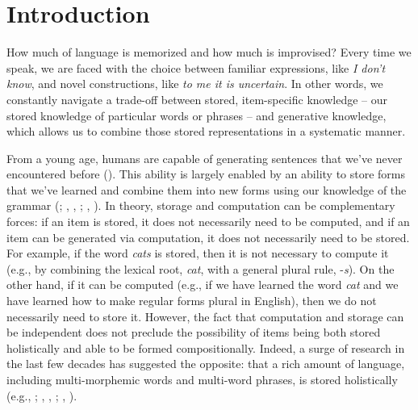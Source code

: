 \documentclass[
  12pt,
  letterpaper,
]{scrreport}
\begin{document}
\singlespacing


\chapter{Introduction}\label{introduction}


\doublespacing

How much of language is memorized and how much is improvised? Every time
we speak, we are faced with the choice between familiar expressions,
like \emph{I don't know}, and novel constructions, like \emph{to me it
is uncertain}. In other words, we constantly navigate a trade-off
between stored, item-specific knowledge -- our stored knowledge of
particular words or phrases -- and generative knowledge, which allows us
to combine those stored representations in a systematic manner.

From a young age, humans are capable of generating sentences that we've
never encountered before
(). This
ability is largely enabled by an ability to store forms that we've
learned and combine them into new forms using our knowledge of the
grammar (;
,
,
;
,
). In theory,
storage and computation can be complementary forces: if an item is
stored, it does not necessarily need to be computed, and if an item can
be generated via computation, it does not necessarily need to be stored.
For example, if the word \emph{cats} is stored, then it is not necessary
to compute it (e.g., by combining the lexical root, \emph{cat}, with a
general plural rule, -\emph{s}). On the other hand, if it can be
computed (e.g., if we have learned the word \emph{cat} and we have
learned how to make regular forms plural in English), then we do not
necessarily need to store it. However, the fact that computation and
storage can be independent does not preclude the possibility of items
being both stored holistically and able to be formed compositionally.
Indeed, a surge of research in the last few decades has suggested the
opposite: that a rich amount of language, including multi-morphemic
words and multi-word phrases, is stored holistically (e.g.,
; , ,
;
,
).
\end{document}
